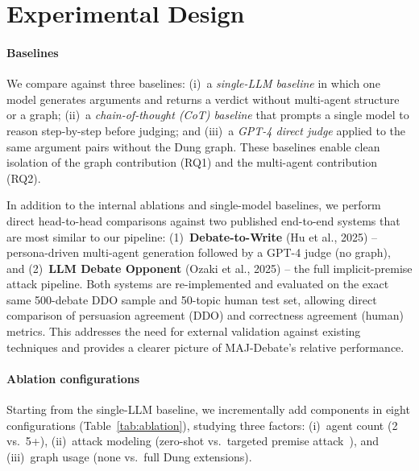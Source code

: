 \documentclass[11pt,twocolumn,letterpaper]{article}
\newcommand{\HumanTestTopics}{50}
\newcommand{\DDOSample}{500}
\begin{document}
\section{Experimental Design}

\paragraph{Baselines}
We compare against three baselines: (i)~a \textit{single-LLM baseline} in
which one model generates arguments and returns a verdict without multi-agent
structure or a graph; (ii)~a \textit{chain-of-thought (CoT) baseline} that
prompts a single model to reason step-by-step before judging; and
(iii)~a \textit{GPT-4 direct judge} applied to the same argument pairs
without the Dung graph. These baselines enable clean isolation of the graph
contribution (RQ1) and the multi-agent contribution (RQ2).

In addition to the internal ablations and single-model baselines, we
perform direct head-to-head comparisons against two published end-to-end
systems that are most similar to our pipeline: (1)~\textbf{Debate-to-Write}
(Hu et al., 2025) -- persona-driven multi-agent generation followed by a
GPT-4 judge (no graph), and (2)~\textbf{LLM Debate Opponent} (Ozaki et al.,
2025) -- the full implicit-premise attack pipeline. Both systems are
re-implemented and evaluated on the exact same \DDOSample-debate DDO sample
and \HumanTestTopics-topic human test set, allowing direct comparison of
persuasion agreement (DDO) and correctness agreement (human) metrics. This
addresses the need for external validation against existing techniques and
provides a clearer picture of MAJ-Debate's relative performance.

\paragraph{Ablation configurations}
Starting from the single-LLM baseline, we incrementally add components
in eight configurations (Table~\ref{tab:ablation}), studying three factors:
(i)~agent count (2 vs.\ 5+), (ii)~attack modeling (zero-shot
vs.\ targeted premise attack~\citep{ozaki2025llmdebate}), and
(iii)~graph usage (none vs.\ full Dung extensions).
\end{document}
